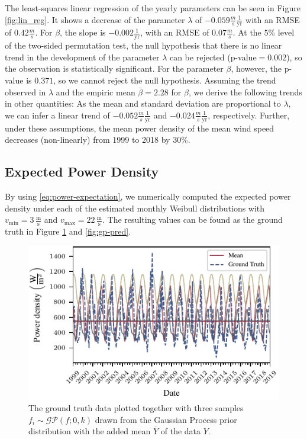 \documentclass{article}
\theoremstyle{plain}
\theoremstyle{definition}
\theoremstyle{remark}
\begin{document}
The least-squares linear regression of the yearly parameters can be seen in Figure \ref{fig:lin_reg}.
It shows a decrease of the parameter $\lambda$ of 
$-0.059\frac{m}{s} \frac{1}{\mathrm{yr}}$ with an RMSE of $0.42\frac{m}{s}$. 
For $\beta$, the slope is $-0.002 \frac{1}{\mathrm{yr}}$, with an RMSE of $0.07  \frac{m}{s}$.
At the $5\%$ level of the two-sided permutation test, the null hypothesis that there is no linear trend in 
the development of the parameter $\lambda$ can be rejected (p-value$=0.002$), so the observation is statistically significant. 
For the parameter $\beta$, however, the p-value is $0.371$, so we cannot reject the null hypothesis.
Assuming the trend observed in $\lambda$ and the empiric mean $\bar \beta=2.28$ for $\beta$, we derive the following trends in other quantities:
As the mean  and standard deviation are proportional to $ \lambda$, we can infer a linear trend of $-0.052 \frac{m}{s}  \frac{1}{\mathrm{yr}}$
and  $-0.024 \frac{m}{s} \frac{1}{\mathrm{yr}}$, respectively. 
Further, under these assumptions, the mean power density 
of the mean wind speed decreases (non-linearly) from 1999 to 2018  by $30\%$. 

\subsection{Expected Power Density}

By using \eqref{eq:power-expectation}, we numerically computed the expected power density under each of the estimated monthly Weibull distributions with $v_\mathrm{min} = 3 \, \frac{\mathrm{m}}{\mathrm{s}}$ and $v_\mathrm{max} = 22 \, \frac{\mathrm{m}}{\mathrm{s}}$. The resulting values can be found as the ground truth in Figure \ref{fig:gp-samples} and \ref{fig:gp-pred}. 

\begin{figure}
    \centering
    \includegraphics{fig/gp_samples.pdf}
    \caption{The \textcolor{TUdarkblue}{ground truth} data plotted together with three samples $f_i \sim \mathcal{GP}(f; 0, k)$ drawn from the Gaussian Process prior distribution with the added \textcolor{TUred}{mean} $\overline{Y}$ of the data $Y$.}
    \label{fig:gp-samples}
\end{figure}
\end{document}

